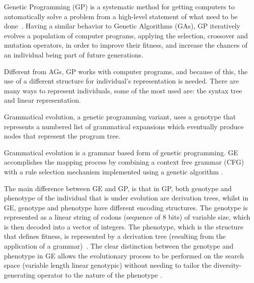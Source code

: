 \documentclass[conference,compsoc]{IEEEtran}
\begin{document}
Genetic Programming (GP) is a systematic method for getting computers to automatically solve a problem from a high-level statement of what need to be done~\cite{koza2005genetic}. Having a similar behavior to Genetic Algorithms (GAs), GP iteratively evolves a population of computer programs, applying the selection, crossover and mutation operators, in order to improve their fitness, and increase the chances of an individual being part of future generations.


Different from AGs, GP works with computer programs, and because of this, the use of a different structure for individual's representation is needed. There are many ways to represent individuals, some of the most used are: the syntax tree and linear representation.




Grammatical evolution, a genetic programming variant, uses a genotype that represents a numbered list of grammatical expansions which eventually produce nodes that represent the program tree.






Grammatical evolution is a grammar based form of genetic programming. GE accomplishes the mapping process by combining a context free grammar (CFG) with a rule selection mechanism implemented using a genetic algorithm \cite{byrne2015optimising}.


The main difference between GE and GP, is that in GP, both genotype and phenotype of the individual that is under evolution are derivation trees, whilst in GE, genotype and phenotype have different encoding structures. The genotype is represented as a linear string of codons (sequence of 8 bits) of variable size, which is then decoded into a vector of integers. The phenotype, which is the structure that defines fitness, is represented by a derivation tree (resulting from the application of a grammar)~\cite{cerri2013grammatical}. The clear distinction between the genotype and phenotype in GE allows the evolutionary process to be performed on the search space (variable length linear genotypic) without needing to tailor the diversity-generating operator to the nature of the phenotype \cite{sabar2013grammatical}.
\end{document}
